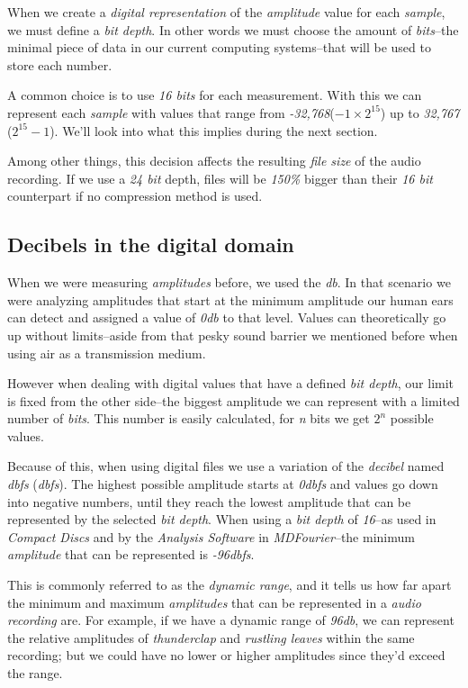 \documentclass[10pt,a4paper]{report}
\newcommand{\define}[1]{\textit{\acrlong{#1}} (\textit{\acrshort{#1}})}
\newcommand{\ac}[1]{\textit{\mbox{\acrshort{#1}}}}
\newcommand{\db}[1]{\textit{\mbox{#1\acrshort{dbfs}}}}
\newcommand{\dbSPL}[1]{\textit{\mbox{#1\acrshort{db}}}}
\begin{document}
When we create a \textit{digital representation} of the \textit{amplitude} value for each \textit{sample}, we must define a \textit{bit depth}. In other words we must choose the amount of \textit{bits}--the minimal piece of data in our current computing systems--that will be used to store each number. 

A common choice is to use \textit{16 bits} for each measurement. With this we can represent each \textit{sample} with values that range from \textit{-32,768}($-1\times2^{15}$) up to \textit{32,767} ($2^{15}-1$). We'll look into what this implies during the next section.

Among other things, this decision affects the resulting \textit{file size} of the audio recording. If we use a \textit{24 bit} depth, files will be \textit{150\%} bigger than their \textit{16 bit} counterpart if no compression method is used.


\subsection{Decibels in the digital domain}

When we were measuring \textit{amplitudes} before, we used the \ac{db}. In that scenario we were analyzing amplitudes that start at the minimum amplitude our human ears can detect and assigned a value of \dbSPL{0} to that level. Values can theoretically go up without limits--aside from that pesky sound barrier we mentioned before when using air as a transmission medium.

However when dealing with digital values that have a defined \textit{bit depth}, our limit is fixed from the other side--the biggest amplitude we can represent with a limited number of \textit{bits}. This number is easily calculated, for \textit{n} bits we get $2^n$ possible values.

Because of this, when using digital files we use a variation of the \textit{decibel} named \define{dbfs}. The highest possible amplitude starts at \db{0} and values go down into negative numbers, until they reach the lowest amplitude that can be represented by the selected \textit{bit depth}. When using a \textit{bit depth} of \textit{16}--as used in \textit{Compact Discs} and by the \textit{Analysis Software} in \textit{MDFourier}--the minimum \textit{amplitude} that can be represented is \db{-96}.

This is commonly referred to as the \textit{dynamic range}, and it tells us how far apart the minimum and maximum \textit{amplitudes} that can be represented in a \textit{audio recording} are. For example, if we have a dynamic range of \dbSPL{96}, we can represent the relative amplitudes of \textit{thunderclap} and \textit{rustling leaves} within the same recording; but we could have no lower or higher amplitudes since they'd exceed the range.
\end{document}
